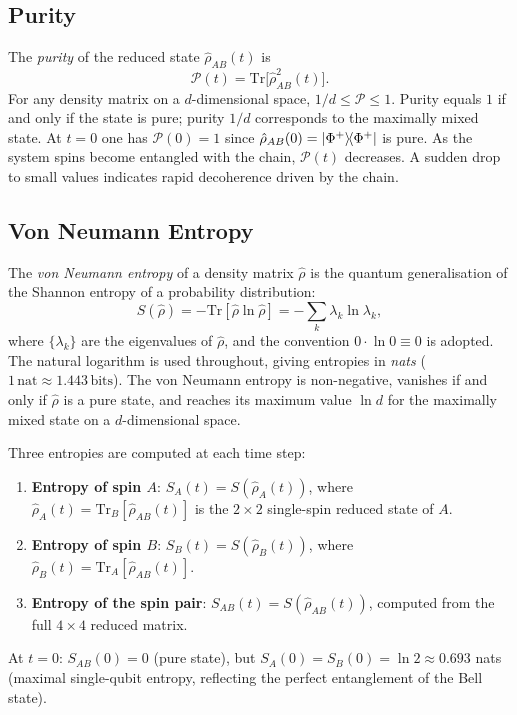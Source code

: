 \documentclass[12pt,a4paper]{article}
\newcommand{\rhohat}{\hat{\rho}}
\renewcommand{\Tr}{\mathrm{Tr}}
\begin{document}
\subsection{Purity}
\label{subsec:purity}

The \emph{purity} of the reduced state $\rhohat_{AB}(t)$ is
\begin{equation}
  \mathcal{P}(t) = \Tr\!\bigl[\rhohat_{AB}^2(t)\bigr].
  \label{eq:purity}
\end{equation}
For any density matrix on a $d$-dimensional space, $1/d \leq \mathcal{P} \leq 1$.
Purity equals $1$ if and only if the state is pure; purity $1/d$ corresponds to
the maximally mixed state.  At $t=0$ one has $\mathcal{P}(0)=1$ since
$\rhohat_{AB}(0)=\ketbra{\Phi^+}{\Phi^+}$ is pure.  As the system spins become
entangled with the chain, $\mathcal{P}(t)$ decreases.  A sudden drop to small
values indicates rapid decoherence driven by the chain.

\subsection{Von Neumann Entropy}
\label{subsec:vne}

The \emph{von Neumann entropy} of a density matrix $\rhohat$ is the quantum
generalisation of the Shannon entropy of a probability distribution:
\begin{equation}
  S(\rhohat) = -\Tr[\rhohat\ln\rhohat] = -\sum_k \lambda_k\ln\lambda_k,
  \label{eq:vne}
\end{equation}
where $\{\lambda_k\}$ are the eigenvalues of $\rhohat$, and the convention
$0\cdot\ln 0 \equiv 0$ is adopted.  The natural logarithm is used throughout,
giving entropies in \emph{nats} ($1\,\text{nat}\approx 1.443\,\text{bits}$).
The von Neumann entropy is non-negative, vanishes if and only if $\rhohat$ is a
pure state, and reaches its maximum value $\ln d$ for the maximally mixed state
on a $d$-dimensional space.

Three entropies are computed at each time step:
\begin{enumerate}[label=(\roman*)]
  \item \textbf{Entropy of spin $A$}:
        $S_A(t) = S(\rhohat_A(t))$,
        where $\rhohat_A(t) = \Tr_B[\rhohat_{AB}(t)]$ is the $2\times2$
        single-spin reduced state of $A$.
  \item \textbf{Entropy of spin $B$}:
        $S_B(t) = S(\rhohat_B(t))$,
        where $\rhohat_B(t) = \Tr_A[\rhohat_{AB}(t)]$.
  \item \textbf{Entropy of the spin pair}:
        $S_{AB}(t) = S(\rhohat_{AB}(t))$,
        computed from the full $4\times4$ reduced matrix.
\end{enumerate}
At $t=0$: $S_{AB}(0)=0$ (pure state), but
$S_A(0) = S_B(0) = \ln 2 \approx 0.693$ nats (maximal single-qubit entropy,
reflecting the perfect entanglement of the Bell state).
\end{document}
